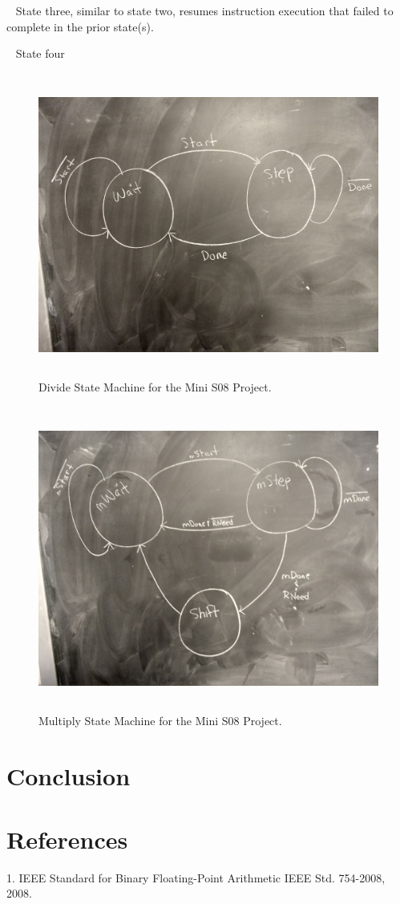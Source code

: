 \documentclass[letterpaper, 12pt]{article}
\begin{document}
\begin{flushleft}
~\newline
State three, similar to state two, resumes instruction execution that failed to complete in the prior state(s).  

~\newline
State four
\newpage
 \begin{figure}[H]
 	\centering
	\includegraphics[width=\linewidth,height=10cm,keepaspectratio]{divide_states.jpg}
	\caption[Mini S08 Division State Machine Diagram]{Divide State Machine for the Mini S08 Project.}
	\label{fig:arch}
\end{figure}

 \begin{figure}[H]
 	\centering
	\includegraphics[width=\linewidth,height=10cm,keepaspectratio]{multiply_states.jpg}
	\caption[Mini S08 Multiply State Machine Diagram]{Multiply State Machine for the Mini S08 Project.}
	\label{fig:arch}
\end{figure}
\section*{Conclusion}

\newpage
\section*{References}
1. IEEE Standard for Binary Floating-Point Arithmetic IEEE Std. 754-2008, 2008. 
\end{flushleft}
\end{document}
